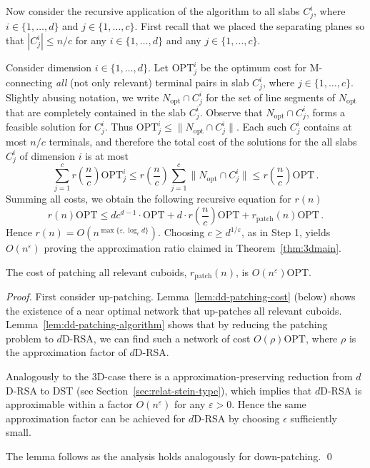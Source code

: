 \documentclass[11pt]{llncs}
\newcommand{\Nopt}{\ensuremath{N_\mathrm{opt}}\xspace}
\newcommand{\eps}{\ensuremath{\varepsilon}\xspace}
\newcommand{\opt}{\ensuremath{\mathrm{OPT}}\xspace}
\newcommand{\rpatch}{\ensuremath{r_\mathrm{patch}}}
\newenvironment{pf}{\begin{proof}}{\qed\end{proof}}
\begin{document}
Now consider the recursive application of the algorithm to all slabs
$C_j^i$, where $i\in\{1,\dots,d\}$ and $j\in\{1,\dots,c\}$.  First
recall that we placed the separating planes so that $|C_j^i|\leq n/c$
for any $i\in\{1,\dots,d\}$ and any $j\in\{1,\dots,c\}$.

Consider dimension $i\in\{1,\dots,d\}$.  Let $\opt_j^i$ be the optimum
cost for M-connecting \emph{all} (not only relevant) terminal pairs in
slab $C_j^i$, where $j\in\{1,\dots,c\}$.  Slightly abusing notation, we
write $\Nopt\cap C_j^i$ for the set of line segments of $\Nopt$ that
are completely contained in the slab $C_j^i$.  Observe that $\Nopt\cap
C_j^i$, forms a feasible solution for $C_j^i$. Thus $\opt_j^i\leq
\|\Nopt\cap C_j^i\|$.  Each such $C_j^i$ contains at most $n/c$
terminals, and therefore the total cost of the solutions for the all
slabs $C_j^i$ of dimension $i$ is at most 
\begin{displaymath}
  \sum_{j=1}^cr\left(\frac{n}{c}\right)\opt_j^i\leq
  r\left(\frac{n}{c}\right)\sum_{j=1}^c\|\Nopt\cap C_j^i\|\leq
  r\left(\frac{n}{c}\right)\opt\,.
\end{displaymath}
Summing all costs, we obtain the following recursive equation for $r(n)$
\begin{displaymath}
  r(n)\opt \leq dc^{d-1}\cdot\opt+d\cdot
  r\left(\frac{n}{c}\right)\opt+r_{\text{patch}}(n)\opt\,. 
\end{displaymath}
Hence $r(n)=O(n^{\max\{\eps,\log_cd\}})$.  Choosing
$c \ge d^{1/\eps}$, as in Step 1, yields $O(n^\eps)$ proving the
approximation ratio claimed in Theorem~\ref{thm:3dmain}.

\begin{lemma}
  \label{lem:dd-dstpatch} 
  The cost of patching all relevant cuboids, $\rpatch(n)$, is
  $O(n^{\eps})\opt$.
\end{lemma}

\begin{pf}
  First consider up-patching. Lemma~\ref{lem:dd-patching-cost} (below)
  shows the existence of a near optimal network that up-patches all
  relevant cuboids. Lemma~\ref{lem:dd-patching-algorithm} shows that
  by reducing the patching problem to $d$D-RSA, we can find such a
  network of cost $O(\rho)\opt$, where $\rho$ is the approximation
  factor of $d$D-RSA.

  Analogously to the 3D-case there is a approximation-preserving
  reduction from $d$D-RSA to DST (see
  Section~\ref{sec:relat-stein-type}), which implies that $d$D-RSA is
  approximable within a factor $O(n^\eps)$ for any $\eps>0$.  Hence
  the same approximation factor can be achieved for $d$D-RSA by
  choosing $\epsilon$ sufficiently small.

  The lemma follows as the analysis holds analogously for
  down-patching.
\end{pf}
\end{document}
